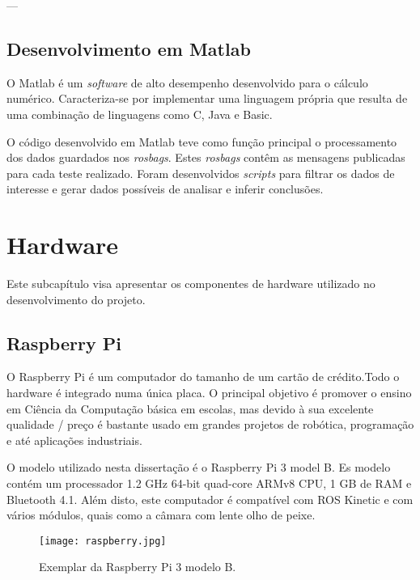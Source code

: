 ---



\subsection{Desenvolvimento em Matlab}

O Matlab é um \textit{software} de alto desempenho desenvolvido para o cálculo numérico. Caracteriza-se por implementar uma linguagem própria que resulta de uma combinação de linguagens como C, Java e Basic.

O código desenvolvido em Matlab teve como função principal o processamento dos dados guardados nos \textit{rosbags}. Estes \textit{rosbags} contêm as mensagens publicadas para cada teste realizado. Foram desenvolvidos \textit{scripts} para filtrar os dados de interesse e gerar dados possíveis de analisar e inferir conclusões.


\section{Hardware}

Este subcapítulo visa apresentar os componentes de hardware utilizado no desenvolvimento do projeto.

\subsection{Raspberry Pi}

O Raspberry Pi é um computador do tamanho de um cartão de crédito.Todo o hardware é integrado numa única placa. O principal objetivo é promover o ensino em Ciência da Computação básica em escolas, mas devido à sua excelente qualidade / preço é bastante usado em grandes projetos de robótica, programação e até aplicações industriais. 

O modelo utilizado nesta dissertação é o Raspberry Pi 3 model B. Es modelo contém um processador 1.2 GHz 64-bit quad-core ARMv8 CPU, 1 GB de RAM e Bluetooth 4.1. Além disto, este computador é compatível com ROS Kinetic e com vários módulos, quais como a câmara com lente olho de peixe.

\begin{figure}[h!] %
	\begin{center}
		\leavevmode		
		\texttt{[image: raspberry.jpg]}
		\caption{Exemplar da Raspberry Pi 3 modelo B.}
		\label{fig:raspberry}
	\end{center}
\end{figure}

